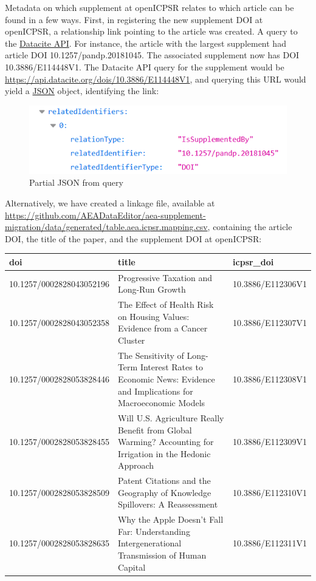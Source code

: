 \documentclass[]{article}
\begin{document}
Metadata on which supplement at openICPSR relates to which article can
be found in a few ways. First, in registering the new supplement DOI at
openICPSR, a relationship link pointing to the article was created. A
query to the \href{https://api.datacite.org/}{Datacite API}. For
instance, the article with the largest supplement had article DOI
10.1257/pandp.20181045. The associated supplement now has DOI
10.3886/E114448V1. The Datacite API query for the supplement would be
\url{https://api.datacite.org/dois/10.3886/E114448V1}, and querying this
URL would yield a \href{https://www.json.org/}{JSON} object, identifying
the link:

\begin{figure}
\centering
\includegraphics{../assets/datacite_api_extract.png}
\caption{Partial JSON from query}
\end{figure}

Alternatively, we have created a linkage file, available at
\url{https://github.com/AEADataEditor/aea-supplement-migration/data/generated/table.aea.icpsr.mapping.csv},
containing the article DOI, the title of the paper, and the supplement
DOI at openICPSR:

\begin{table}[H]
\centering
\begin{tabular}{l|l|l}
\hline
doi & title & icpsr\_doi\\
\hline
10.1257/0002828043052196 & Progressive Taxation and Long-Run Growth & 10.3886/E112306V1\\
\hline
10.1257/0002828043052358 & The Effect of Health Risk on Housing Values: Evidence from a Cancer Cluster & 10.3886/E112307V1\\
\hline
10.1257/0002828053828446 & The Sensitivity of Long-Term Interest Rates to Economic News: Evidence and Implications for Macroeconomic Models & 10.3886/E112308V1\\
\hline
10.1257/0002828053828455 & Will U.S. Agriculture Really Benefit from Global Warming? Accounting for Irrigation in the Hedonic Approach & 10.3886/E112309V1\\
\hline
10.1257/0002828053828509 & Patent Citations and the Geography of Knowledge Spillovers: A Reassessment & 10.3886/E112310V1\\
\hline
10.1257/0002828053828635 & Why the Apple Doesn't Fall Far: Understanding Intergenerational Transmission of Human Capital & 10.3886/E112311V1\\
\hline
\end{tabular}
\end{table}
\end{document}
